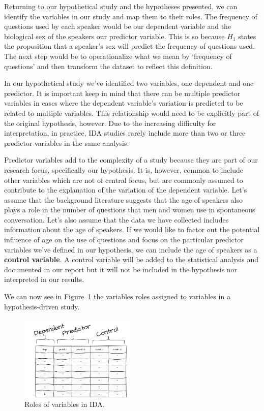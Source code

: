 \documentclass[
  letterpaper,
  DIV=11,
  numbers=noendperiod]{scrreport}
\theoremstyle{definition}
\theoremstyle{remark}
\begin{document}
Returning to our hypothetical study and the hypotheses presented, we can
identify the variables in our study and map them to their roles. The
frequency of questions used by each speaker would be our dependent
variable and the biological sex of the speakers our predictor variable.
This is so because \(H_1\) states the proposition that a speaker's sex
will predict the frequency of questions used. The next step would be to
operationalize what we mean by `frequency of questions' and then
transform the dataset to reflect this definition.

In our hypothetical study we've identified two variables, one dependent
and one predictor. It is important keep in mind that there can be
multiple predictor variables in cases where the dependent variable's
variation is predicted to be related to multiple variables. This
relationship would need to be explicitly part of the original
hypothesis, however. Due to the increasing difficulty for
interpretation, in practice, IDA studies rarely include more than two or
three predictor variables in the same analysis.

Predictor variables add to the complexity of a study because they are
part of our research focus, specifically our hypothesis. It is, however,
common to include other variables which are not of central focus, but
are commonly assumed to contribute to the explanation of the variation
of the dependent variable. Let's assume that the background literature
suggests that the age of speakers also plays a role in the number of
questions that men and women use in spontaneous conversation. Let's also
assume that the data we have collected includes information about the
age of speakers. If we would like to factor out the potential influence
of age on the use of questions and focus on the particular predictor
variables we've defined in our hypothesis, we can include the age of
speakers as a \textbf{control variable}. A control variable will be
added to the statistical analysis and documented in our report but it
will not be included in the hypothesis nor interpreted in our results.

We can now see in Figure~\ref{fig-aa-ida-variables} the variables roles
assigned to variables in a hypothesis-driven study.

\begin{figure}[H]

{\centering \includegraphics[width=0.5\textwidth,height=\textheight]{figures/aa-ida-variables.drawio.png}

}

\caption{\label{fig-aa-ida-variables}Roles of variables in IDA.}

\end{figure}
\end{document}
